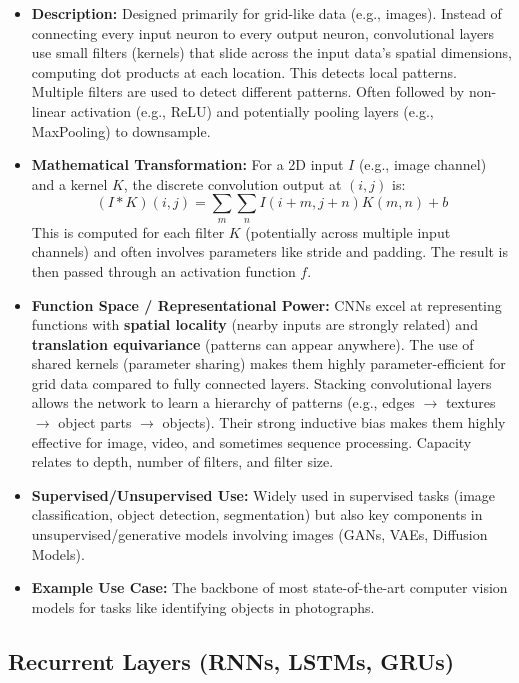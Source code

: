 \documentclass{article}
\begin{document}
\begin{itemize}
    \item \textbf{Description:} Designed primarily for grid-like data (e.g., images). Instead of connecting every input neuron to every output neuron, convolutional layers use small filters (kernels) that slide across the input data's spatial dimensions, computing dot products at each location. This detects local patterns. Multiple filters are used to detect different patterns. Often followed by non-linear activation (e.g., ReLU) and potentially pooling layers (e.g., MaxPooling) to downsample.
    \item \textbf{Mathematical Transformation:} For a 2D input $I$ (e.g., image channel) and a kernel $K$, the discrete convolution output at $(i, j)$ is:
        \begin{equation}
            (I * K)(i, j) = \sum_{m} \sum_{n} I(i+m, j+n) K(m, n) + b
        \end{equation}
        This is computed for each filter $K$ (potentially across multiple input channels) and often involves parameters like stride and padding. The result is then passed through an activation function $f$.
    \item \textbf{Function Space / Representational Power:} CNNs excel at representing functions with \textbf{spatial locality} (nearby inputs are strongly related) and \textbf{translation equivariance} (patterns can appear anywhere). The use of shared kernels (parameter sharing) makes them highly parameter-efficient for grid data compared to fully connected layers. Stacking convolutional layers allows the network to learn a hierarchy of patterns (e.g., edges $\to$ textures $\to$ object parts $\to$ objects). Their strong inductive bias makes them highly effective for image, video, and sometimes sequence processing. Capacity relates to depth, number of filters, and filter size.
    \item \textbf{Supervised/Unsupervised Use:} Widely used in supervised tasks (image classification, object detection, segmentation) but also key components in unsupervised/generative models involving images (GANs, VAEs, Diffusion Models).
    \item \textbf{Example Use Case:} The backbone of most state-of-the-art computer vision models for tasks like identifying objects in photographs.
\end{itemize}

\subsection{Recurrent Layers (RNNs, LSTMs, GRUs)}
\end{document}
